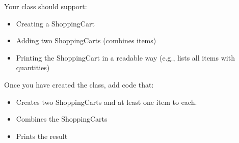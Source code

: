 \documentclass{article}
\begin{document}
\begin{enumerate}
		Your class should support:
		\begin{itemize}
			\item Creating a ShoppingCart
			\item Adding two ShoppingCarts (combines items)
			\item Printing the ShoppingCart in a readable way 
				(e.g., lists all items with quantities)
		\end{itemize}
		
		Once you have created the class, add code that:
		\begin{itemize}
			\item Creates two ShoppingCarts and at least one item to each.
			\item Combines the ShoppingCarts
			\item Prints the result
		\end{itemize}


\end{enumerate}
\pagebreak
\end{document}
